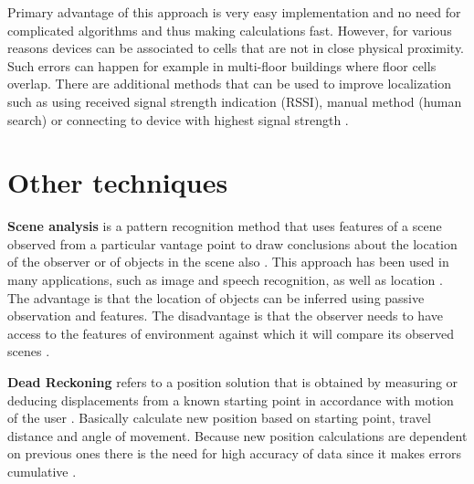 Primary advantage of this approach is very easy implementation and no need for complicated algorithms and thus making calculations fast. However, for various reasons devices can be associated to cells that are not in close physical proximity. Such errors can happen for example in multi-floor buildings where floor cells overlap. There are additional methods that can be used to improve localization such as using received signal strength indication (RSSI), manual method (human search) or connecting to device with highest signal strength \cite{WiFiLBS, RAinWILTaS}.

\section{Other techniques}
\textbf{Scene analysis} is a pattern recognition method that uses features of a scene observed from a particular vantage point to draw conclusions about the location of the observer or of objects in the scene also \cite{LSfUC}. This approach has been used in many applications, such as image and speech recognition, as well as location \cite{LSAWIFI}. The advantage is that the location of objects can be inferred using passive observation and features. The disadvantage is that the observer needs to have access to the features of environment against which it will compare its observed scenes \cite{LSfUC}.

\medskip

\textbf{Dead Reckoning} refers to a position solution that is obtained by measuring or deducing displacements from a known starting point in accordance with motion of the user \cite{DRNS}. Basically calculate new position based on starting point, travel distance and angle of movement. Because new position calculations are dependent on previous ones there is the need for high accuracy of data since it makes errors cumulative \cite{IDRAIP}.